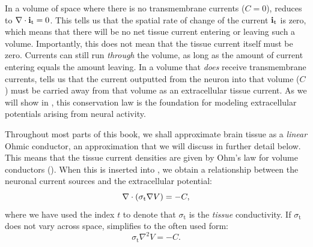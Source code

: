 In a volume of space where there is no transmembrane currents ($C = 0$),  reduces to ${\bf \nabla} \cdot {\bf i}_\text{t} = 0$. This tells us that the spatial rate of change of the current ${\bf i}_\text{t}$ is zero, which means that there will be no net tissue current entering or leaving such a volume. Importantly, this does not mean that the tissue current itself must be zero. Currents can still run \textit{through} the volume, as long as the amount of current entering equals the amount leaving. In a volume that \textit{does} receive transmembrane currents,  tells us that the current outputted from the neuron into that volume ($C$) must be carried away from that volume as an extracellular tissue current. As we will show in , this conservation law is the foundation for modeling extracellular potentials arising from neural activity.

Throughout most parts of this book, we shall approximate brain tissue as a \textit{linear} Ohmic conductor, an approximation that we will discuss in further detail below. This means that the tissue current densities are given by Ohm's law for volume conductors (). When this is inserted into , we obtain a relationship between the neuronal current sources and the extracellular potential:
\begin{equation}
{\bf \nabla} \cdot \left(\sigma_\text{t} {\bf \nabla} {V} \right) = -C,
\label{eq:Basics:continuity2}
\end{equation}
where we have used the index $t$ to denote that $\sigma_\text{t}$ is the \textit{tissue} conductivity.  If $\sigma_\text{t}$ does not vary across space,  simplifies to the often used form:
\begin{equation}
\sigma_\text{t} \nabla^2{V} = -C.
\label{eq:Basics:continuity3}
\end{equation}


